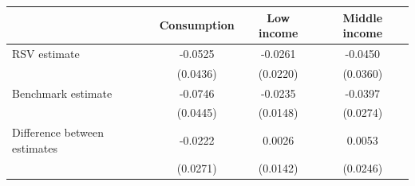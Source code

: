 \begin{threeparttable}
\begin{tabular}{l | ccc}
\toprule
& \multicolumn{1}{c}{Consumption} & \multicolumn{1}{c}{Low income} & \multicolumn{1}{c}{Middle income} \\
\midrule
  RSV estimate & -0.0525 & -0.0261 & -0.0450 \\
           & (0.0436) & (0.0220) & (0.0360) \\
\midrule
\addlinespace[0.3em]
  Benchmark estimate & -0.0746 & -0.0235 & -0.0397 \\
           & (0.0445) & (0.0148) & (0.0274) \\
\midrule
  Difference between estimates & -0.0222 & 0.0026 & 0.0053 \\
           & (0.0271) & (0.0142) & (0.0246) \\
\bottomrule
\end{tabular}
\end{threeparttable}
